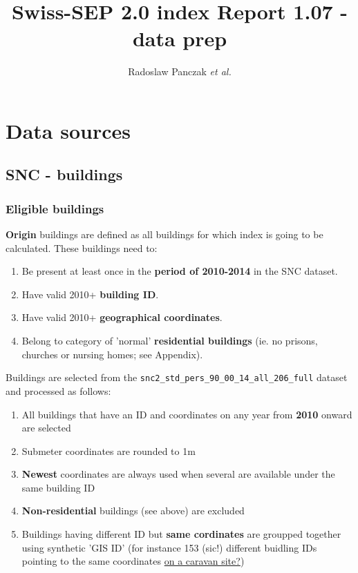 \documentclass[a4paper, notitlepage, fleqn]{article} %
\title{\textbf{Swiss-SEP 2.0 index \endgraf 
Report 1.07 - data prep}}
\author{Radoslaw Panczak \textit{et al.}}
\begin{document}
\maketitle
\tableofcontents

\newpage
\section{Data sources}
\subsection{SNC - buildings}
\subsubsection{Eligible buildings}

\textbf{Origin} buildings are defined as all buildings for which index 
is going to be calculated. These buildings need to:

\begin{enumerate}

	\item Be present at least once in the \textbf{period of 2010-2014} in the SNC dataset.
	\item Have valid 2010+ \textbf{building ID}.
	\item Have valid 2010+ \textbf{geographical coordinates}.
	\item Belong to category of 'normal' \textbf{residential buildings} (ie. no prisons, churches or nursing homes; see Appendix).
	
\end{enumerate}
	
Buildings are selected from the \texttt{snc2\_std\_pers\_90\_00\_14\_all\_206\_full} dataset 
and processed as follows:
	
\begin{enumerate}

	\item All buildings that have an ID and coordinates on any year from \textbf{2010} onward are selected
		
	\item Submeter coordinates are rounded to 1m
		
	\item \textbf{Newest} coordinates are always used when several are available under the same building ID
	
	\item \textbf{Non-residential} buildings (see above) are excluded
	
	\item Buildings having different ID but \textbf{same cordinates} are groupped together using synthetic 'GIS ID'
		(for instance 153 (sic!) different buidling IDs pointing to the same coordinates \href{https://goo.gl/maps/eC8fDZtEboP2}{on a caravan site?})
		
\end{enumerate}
\end{document}
